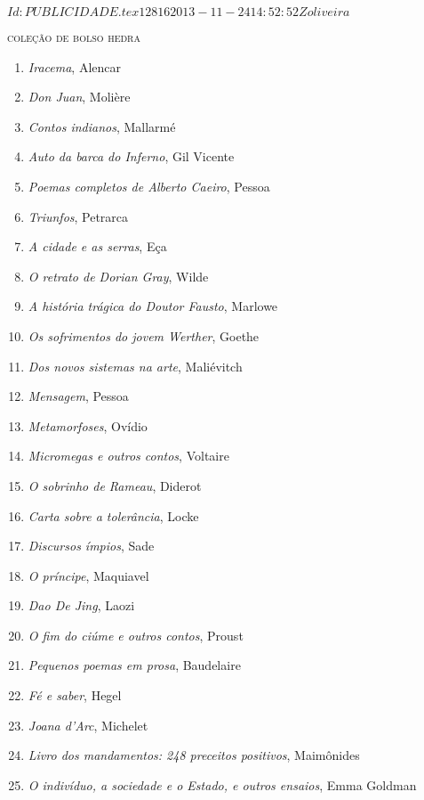 \SVN $Id: PUBLICIDADE.tex 12816 2013-11-24 14:52:52Z oliveira $ 

\ifodd\thepage\paginabranca\else\clearpage\fi
\pagestyle{empty}

\begingroup
\fontsize{7}{8}\selectfont
{\large\textsc{coleção de bolso hedra}}\\
\begin{enumerate}
\setlength\parskip{4.2pt}
\setlength\itemsep{-1.4mm}
\item \textit{Iracema}, Alencar
\item \textit{Don Juan}, Molière
\item \textit{Contos indianos}, Mallarmé
\item \textit{Auto da barca do Inferno}, Gil Vicente
\item \textit{Poemas completos de Alberto Caeiro}, Pessoa
\item \textit{Triunfos}, Petrarca
\item \textit{A cidade e as serras}, Eça
\item \textit{O retrato de Dorian Gray}, Wilde
\item \textit{A história trágica do Doutor Fausto}, Marlowe
\item \textit{Os sofrimentos do jovem Werther}, Goethe
\item \textit{Dos novos sistemas na arte}, Maliévitch
\item \textit{Mensagem}, Pessoa
\item \textit{Metamorfoses}, Ovídio
\item \textit{Micromegas e outros contos}, Voltaire
\item \textit{O sobrinho de Rameau}, Diderot
\item \textit{Carta sobre a tolerância}, Locke
\item \textit{Discursos ímpios}, Sade
\item \textit{O príncipe}, Maquiavel
\item \textit{Dao De Jing}, Laozi
\item \textit{O fim do ciúme e outros contos}, Proust
\item \textit{Pequenos poemas em prosa}, Baudelaire
\item \textit{Fé e saber}, Hegel
\item \textit{Joana d'Arc}, Michelet
\item \textit{Livro dos mandamentos: 248 preceitos positivos}, Maimônides
\item \textit{O indivíduo, a sociedade e o Estado, e outros ensaios}, Emma Goldman

\end{enumerate}

